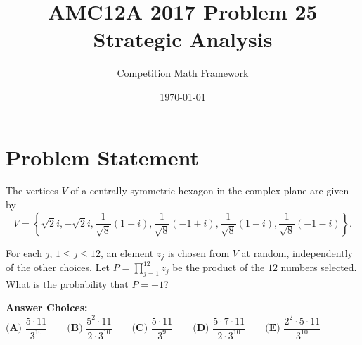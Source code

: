 \documentclass[]{article}
\begin{document}
\title{\textbf{AMC12A 2017 Problem 25\\Strategic Analysis}}
\author{Competition Math Framework}
\date{\today}
\maketitle

\section*{Problem Statement}

The vertices $V$ of a centrally symmetric hexagon in the complex plane are given by
\[V=\left\{ \sqrt{2}i,-\sqrt{2}i, \frac{1}{\sqrt{8}}(1+i),\frac{1}{\sqrt{8}}(-1+i),\frac{1}{\sqrt{8}}(1-i),\frac{1}{\sqrt{8}}(-1-i) \right\}.\]

For each $j$, $1\leq j\leq 12$, an element $z_j$ is chosen from $V$ at random, independently of the other choices. Let $P={\prod}_{j=1}^{12}z_j$ be the product of the $12$ numbers selected. What is the probability that $P=-1$?

\vspace{0.5em}
\noindent\textbf{Answer Choices:}\\
$\textbf{(A) } \dfrac{5\cdot11}{3^{10}} \qquad \textbf{(B) } \dfrac{5^2\cdot11}{2\cdot3^{10}} \qquad \textbf{(C) } \dfrac{5\cdot11}{3^{9}} \qquad \textbf{(D) } \dfrac{5\cdot7\cdot11}{2\cdot3^{10}} \qquad \textbf{(E) } \dfrac{2^2\cdot5\cdot11}{3^{10}}$
\end{document}
